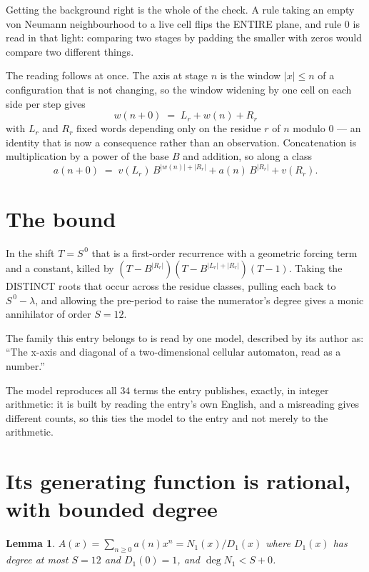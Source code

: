 \documentclass[11pt,a4paper]{article}
\theoremstyle{plain}
\newtheorem{lemma}[theorem]{Lemma}
\theoremstyle{definition}
\begin{document}
Getting the background right is the whole of the check. A rule taking an empty von Neumann
neighbourhood to a live cell flips the ENTIRE plane, and rule 0 is read
in that light: comparing two stages by padding the smaller with zeros would compare two
different things.

The reading follows at once. The axis at stage $n$ is the window $|x|\le n$ of a configuration
that is not changing, so the window widening by one cell on each side per step gives
\[
w(n+0)\;=\;L_r + w(n) + R_r
\]
with $L_r$ and $R_r$ fixed words depending only on the residue $r$ of $n$ modulo $0$ --- an
identity that is now a consequence rather than an observation. Concatenation is multiplication
by a power of the base $B$ and addition, so along a class
\[
a(n+0)\;=\;v(L_r)\,B^{|w(n)|+|R_r|} + a(n)\,B^{|R_r|} + v(R_r).
\]

\section{The bound}

In the shift $T=S^{\,0}$ that is a first-order recurrence with a geometric forcing term and a
constant, killed by $(T-B^{|R_r|})(T-B^{|L_r|+|R_r|})(T-1)$. Taking the DISTINCT roots that
occur across the residue classes, pulling each back to $S^{\,0}-\lambda$, and allowing the
pre-period to raise the numerator's degree gives a monic annihilator of order $S=12$.

The family this entry belongs to is read by one model, described by its author as: ``The x-axis and diagonal of a two-dimensional cellular automaton, read as a number.''


The model reproduces all $34$ terms the entry publishes, exactly, in integer arithmetic:
it is built by reading the entry's own English, and a misreading gives different counts, so
this ties the model to the entry and not merely to the arithmetic.

\section{Its generating function is rational, with bounded degree}

\begin{lemma}\label{lem:rat}
$A(x)=\sum_{n\ge0}a(n)x^n=N_1(x)/D_1(x)$ where $D_1(x)$ has degree at most $S=12$ and
$D_1(0)=1$, and $\deg N_1<S+0$.
\end{lemma}
\end{document}
